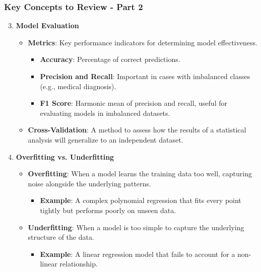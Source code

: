 \documentclass[aspectratio=169]{beamer}
\begin{document}
\begin{frame}[fragile]
    \frametitle{Key Concepts to Review - Part 2}
    \begin{enumerate}
        \setcounter{enumi}{2}  %
        \item \textbf{Model Evaluation}
            \begin{itemize}
                \item \textbf{Metrics}: Key performance indicators for determining model effectiveness.
                \begin{itemize}
                    \item \textbf{Accuracy}: Percentage of correct predictions.
                    \item \textbf{Precision and Recall}: Important in cases with imbalanced classes (e.g., medical diagnosis).
                    \item \textbf{F1 Score}: Harmonic mean of precision and recall, useful for evaluating models in imbalanced datasets.
                \end{itemize}
                \item \textbf{Cross-Validation}: A method to assess how the results of a statistical analysis will generalize to an independent dataset.
            \end{itemize}
        \item \textbf{Overfitting vs. Underfitting}
            \begin{itemize}
                \item \textbf{Overfitting}: When a model learns the training data too well, capturing noise alongside the underlying patterns.
                    \begin{itemize}
                        \item \textbf{Example}: A complex polynomial regression that fits every point tightly but performs poorly on unseen data.
                    \end{itemize}
                \item \textbf{Underfitting}: When a model is too simple to capture the underlying structure of the data.
                    \begin{itemize}
                        \item \textbf{Example}: A linear regression model that fails to account for a non-linear relationship.
                    \end{itemize}
            \end{itemize}
    \end{enumerate}
\end{frame}
\end{document}
